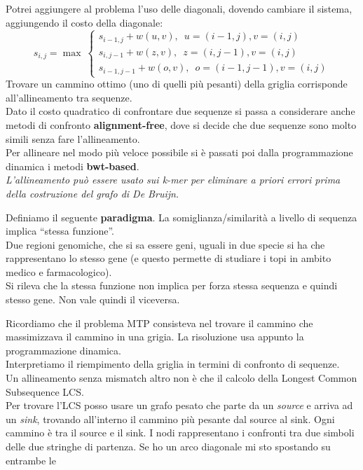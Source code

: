 \documentclass[a4paper,12pt, oneside]{book}
\begin{document}
Potrei aggiungere al problema l'uso delle diagonali, dovendo cambiare il
sistema, aggiungendo il costo della diagonale:
\[s_{i,j}=\max\
  \begin{cases}
    s_{i-1,j} + w(u,v),\,\,\, u=(i-1,j),v=(i,j)\\
    s_{i,j-1} + w(z,v),\,\,\, z=(i,j-1),v=(i,j)\\
    s_{i-1,j-1} + w(o,v),\,\,\, o=(i-1,j-1),v=(i,j)
  \end{cases}
\]
Trovare un cammino ottimo (uno di quelli più pesanti) della griglia corrisponde
all'allineamento tra sequenze. \\
Dato il costo quadratico di confrontare due sequenze si passa a considerare
anche metodi di confronto \textbf{alignment-free}, dove si decide che due
sequenze sono molto simili senza fare l'allineamento.\\
Per allineare nel modo più veloce possibile si è passati poi dalla
programmazione dinamica i metodi \textbf{bwt-based}.\\
\textit{L'allineamento può essere usato sui k-mer per eliminare a priori errori
  prima della costruzione del grafo di De Bruijn.}\\
\begin{definizione}
  Definiamo il seguente \textbf{paradigma}. La somiglianza/similarità a livello
  di sequenza implica ``stessa funzione''.\\
  Due regioni genomiche, che si sa essere geni, uguali in due specie si ha che
  rappresentano lo stesso gene (e questo permette di studiare i topi in ambito
  medico e farmacologico).\\
  Si rileva che la stessa funzione non implica per forza stessa sequenza e
  quindi stesso gene. Non vale quindi il viceversa.
\end{definizione}
Ricordiamo che il problema MTP consisteva nel trovare il cammino che
massimizzava il cammino in una grigia. La risoluzione usa appunto la
programmazione dinamica.\\
Interpretiamo il riempimento della griglia in termini di confronto di
sequenze.\\
Un allineamento senza mismatch altro non è che il calcolo della Longest Common
Subsequence LCS.\\
Per trovare l'LCS posso usare un grafo pesato che parte da un \textit{source} e
arriva ad un \textit{sink}, trovando all'interno il cammino più pesante dal
source al sink. Ogni cammino è tra il source e il sink. I nodi rappresentano i
confronti tra due simboli delle due 
stringhe di partenza. Se ho un arco diagonale mi sto spostando su entrambe le
\end{document}
